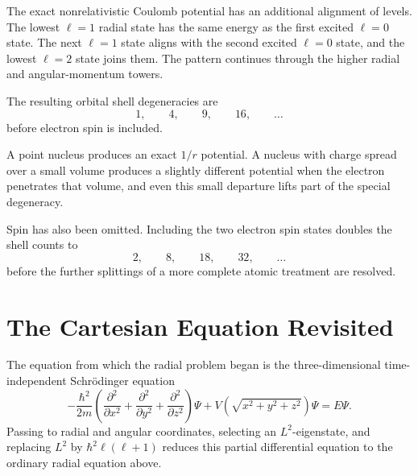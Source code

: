 The exact nonrelativistic Coulomb potential has an additional alignment of levels. The lowest \(\ell=1\) radial state has the same energy as the first excited \(\ell=0\) state. The next \(\ell=1\) state aligns with the second excited \(\ell=0\) state, and the lowest \(\ell=2\) state joins them. The pattern continues through the higher radial and angular-momentum towers.

\begin{classroomqa}
\end{classroomqa}

The resulting orbital shell degeneracies are
\begin{equation}
1,\qquad 4,\qquad 9,\qquad 16,\qquad \ldots
\end{equation}
before electron spin is included.

\begin{classroomqa}
\end{classroomqa}

A point nucleus produces an exact \(1/r\) potential. A nucleus with charge spread over a small volume produces a slightly different potential when the electron penetrates that volume, and even this small departure lifts part of the special degeneracy.

Spin has also been omitted. Including the two electron spin states doubles the shell counts to
\begin{equation}
2,\qquad 8,\qquad 18,\qquad 32,\qquad \ldots
\end{equation}
before the further splittings of a more complete atomic treatment are resolved.

\section{The Cartesian Equation Revisited}

The equation from which the radial problem began is the three-dimensional time-independent Schr\"odinger equation
\begin{equation}
-\frac{\hbar^2}{2m}
\left(
\frac{\partial^2}{\partial x^2}
+\frac{\partial^2}{\partial y^2}
+\frac{\partial^2}{\partial z^2}
\right)\Psi
+V\!\left(\sqrt{x^2+y^2+z^2}\right)\Psi
=E\Psi.
\end{equation}
Passing to radial and angular coordinates, selecting an \(L^2\)-eigenstate, and replacing \(L^2\) by \(\hbar^2\ell(\ell+1)\) reduces this partial differential equation to the ordinary radial equation above.

